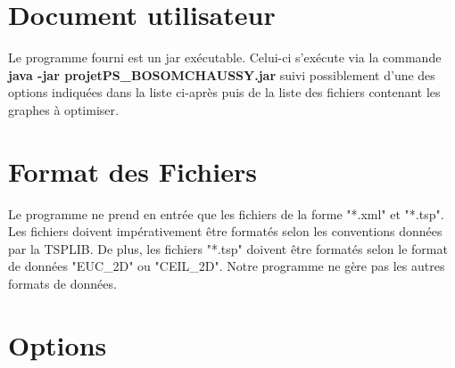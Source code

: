 \documentclass{article}
\begin{document}



\section{Document utilisateur}

Le programme fourni est un jar exécutable. Celui-ci s'exécute via la commande \textbf{java -jar projetPS\_BOSOMCHAUSSY.jar} suivi possiblement d'une des options indiquées dans la liste ci-après puis de la liste des fichiers contenant les graphes à optimiser.

\section*{Format des Fichiers}

Le programme ne prend en entrée que les fichiers de la forme "*.xml" et "*.tsp". Les fichiers doivent impérativement être formatés selon les conventions données par la TSPLIB.
De plus, les fichiers "*.tsp" doivent être formatés selon le format de données "EUC\_2D" ou "CEIL\_2D". Notre programme ne gère pas les autres formats de données.

\section*{Options}
\end{document}
